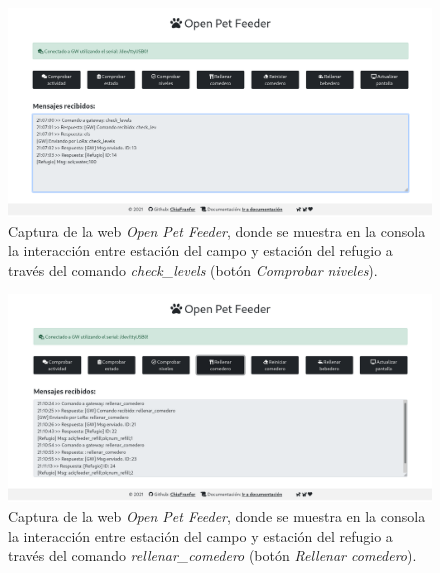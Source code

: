 \documentclass[12pt]{article}
\begin{document}
	\begin{figure}[h!]
		\begin{center}
			\includegraphics[width=1\textwidth]{img_comp/captura_web_4.png}
			\caption{Captura de la web \textit{Open Pet Feeder}, donde se muestra en la consola la interacción entre estación del campo y estación del refugio a través del comando \textit{check\_levels} (botón \textit{Comprobar niveles}).}
			\label{captura web 4}
		\end{center}
	\end{figure}

	\pagebreak
	
	\begin{figure}[h!]
		\begin{center}
			\includegraphics[width=1\textwidth]{img_comp/captura_web_5.png}
			\caption{Captura de la web \textit{Open Pet Feeder}, donde se muestra en la consola la interacción entre estación del campo y estación del refugio a través del comando \textit{rellenar\_comedero} (botón \textit{Rellenar comedero}).}
			\label{captura web 5}
		\end{center}
	\end{figure}

	\pagebreak
	
\end{document}

